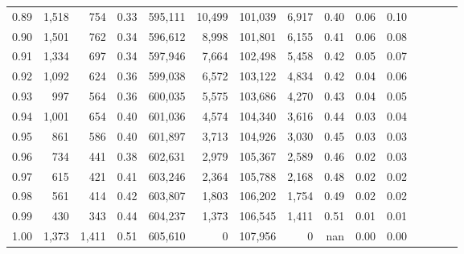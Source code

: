 \begin{tabular}{rrrcrrrrrrrrrrr}
0.89 &   1,518 &    754 &                                       0.33 &  595,111 &   10,499 &  101,039 &    6,917 &  0.40 &  0.06 &                         0.10 \\
0.90 &   1,501 &    762 &                                       0.34 &  596,612 &    8,998 &  101,801 &    6,155 &  0.41 &  0.06 &                         0.08 \\
0.91 &   1,334 &    697 &                                       0.34 &  597,946 &    7,664 &  102,498 &    5,458 &  0.42 &  0.05 &                         0.07 \\
0.92 &   1,092 &    624 &                                       0.36 &  599,038 &    6,572 &  103,122 &    4,834 &  0.42 &  0.04 &                         0.06 \\
0.93 &     997 &    564 &                                       0.36 &  600,035 &    5,575 &  103,686 &    4,270 &  0.43 &  0.04 &                         0.05 \\
0.94 &   1,001 &    654 &                                       0.40 &  601,036 &    4,574 &  104,340 &    3,616 &  0.44 &  0.03 &                         0.04 \\
0.95 &     861 &    586 &                                       0.40 &  601,897 &    3,713 &  104,926 &    3,030 &  0.45 &  0.03 &                         0.03 \\
0.96 &     734 &    441 &                                       0.38 &  602,631 &    2,979 &  105,367 &    2,589 &  0.46 &  0.02 &                         0.03 \\
0.97 &     615 &    421 &                                       0.41 &  603,246 &    2,364 &  105,788 &    2,168 &  0.48 &  0.02 &                         0.02 \\
0.98 &     561 &    414 &                                       0.42 &  603,807 &    1,803 &  106,202 &    1,754 &  0.49 &  0.02 &                         0.02 \\
0.99 &     430 &    343 &                                       0.44 &  604,237 &    1,373 &  106,545 &    1,411 &  0.51 &  0.01 &                         0.01 \\
1.00 &   1,373 &  1,411 &                                       0.51 &  605,610 &        0 &  107,956 &        0 &   nan &  0.00 &                         0.00 \\
\bottomrule
\end{tabular}
